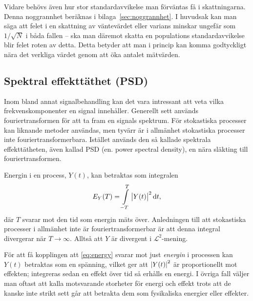 Vidare behövs även hur stor standardavvikelse man förväntas få i skattningarna. Denna noggrannhet beräknas i bilaga~\ref{sec:noggrannhet}. I huvudsak kan man säga att felet i en skattning av väntevärdet eller varians\footnotemark{} minskar ungefär som $1/\sqrt{N}$ i båda fallen -- ska man däremot skatta en populations standardavvikelse blir felet roten av detta. 
Detta betyder att man i princip kan komma godtyckligt nära det verkliga värdet genom att öka antalet mätvärden.



\subsection{Spektral effekttäthet (PSD)} \label{sec:PSD}

Inom bland annat signalbehandling kan det vara intressant att veta vilka frekvenskomponenter en signal innehåller. Generellt sett används fouriertransformen för att ta fram en signals spektrum.
För stokastiska processer kan liknande metoder användas, men tyvärr är i allmänhet stokastiska processer inte fouriertransformerbara. Istället används den så kallade spektrala effekttätheten, även kallad PSD (en. power spectral density), en nära släkting till fouriertransformen.

Energin i en process, $Y(t)$, kan betraktas som integralen
\begin{equation}\label{eq:energy}
E_Y(T) = \int_{-T}^{T} \big|Y(t)\big|^2 \id{t},
\end{equation}
där $T$ svarar mot den tid som energin mäts över. Anledningen till att stokastiska processer i allmänhet inte är fouriertransformerbar är att denna integral divergerar när $T\to\infty$. Alltså att $Y$ är divergent i $\mathcal{L}^2$-mening. 

För att få kopplingen att \eqref{eq:energy} svarar mot just \emph{energin} i processen kan $Y(t)$ betraktas som en spänning, vilket ger att $\abs{Y(t)}^2$ är proportionellt mot effekten; integreras sedan en effekt över tid så erhålls en energi. I övriga fall väljer man oftast att kalla motsvarande storheter för energi och effekt trots att de kanske inte strikt sett går att betrakta dem som fysikaliska energier eller effekter. 

